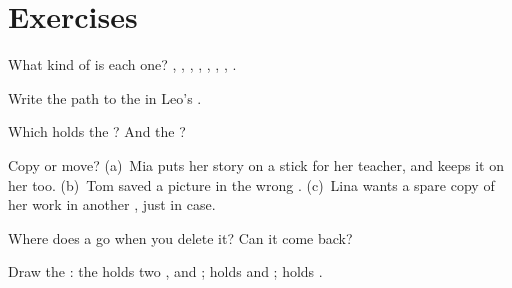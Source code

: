 \section{Exercises}

\begin{exercise}[$\star$]\label{exo:g3:files-and-folders:1}
What kind of  is each one? , ,
, , , ,
, .
\end{exercise}

\begin{exercise}[$\star$]\label{exo:g3:files-and-folders:2}
Write the path to the   in Leo's .
\end{exercise}

\begin{exercise}[$\star$]\label{exo:g3:files-and-folders:3}
Which  holds the  ? And the 
?
\end{exercise}

\begin{exercise}[$\star$]\label{exo:g3:files-and-folders:4}
Copy or move? (a)~Mia puts her story on a  stick for her teacher, and
keeps it on her  too. (b)~Tom saved a picture in the wrong .
(c)~Lina wants a spare copy of her work in another , just in case.
\end{exercise}

\begin{exercise}[$\star$]\label{exo:g3:files-and-folders:5}
Where does a  go when you delete it? Can it come back?
\end{exercise}

\begin{exercise}[$\star$]\label{exo:g3:files-and-folders:6}
Draw the : the   holds two ,
 and ;  holds 
and ;  holds .
\end{exercise}

